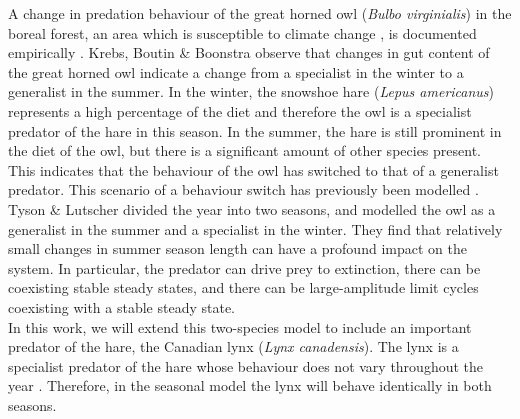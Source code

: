 \documentclass[12pt]{UOthesis}
\theoremstyle{remarkstyle}
\begin{document}
A change in predation behaviour of the great horned owl (\textit{Bulbo virginialis}) in the boreal forest, an area which is susceptible to climate change \cite{AllenEtAl}, is documented empirically \cite{KrebsBoutinDoonstra}. Krebs, Boutin \& Boonstra observe that changes in gut content of the great horned owl indicate a change from a specialist in the winter to a generalist in the summer. In the winter, the snowshoe hare (\textit{Lepus americanus}) represents a high percentage of the diet and therefore the owl is a specialist predator of the hare in this season. In the summer, the hare is still prominent in the diet of the owl, but there is a significant amount of other species present. This indicates that the behaviour of the owl has switched to that of a generalist predator. This scenario of a behaviour switch has previously been modelled \cite{TysonLutscher}. Tyson \& Lutscher divided the year into two seasons, and modelled the owl as a generalist in the summer and a specialist in the winter. They find that relatively small changes in summer season length can have a profound impact on the system. In particular, the predator can drive prey to extinction, there can be coexisting stable steady states, and there can be large-amplitude limit cycles coexisting with a stable steady state.\\

In this work, we will extend this two-species model to include an important predator of the hare, the Canadian lynx (\textit{Lynx canadensis}). The lynx is a specialist predator of the hare whose behaviour does not vary throughout the year \cite{KrebsBoutinDoonstra}. Therefore, in the seasonal model the lynx will behave identically in both seasons.\\
\end{document}
